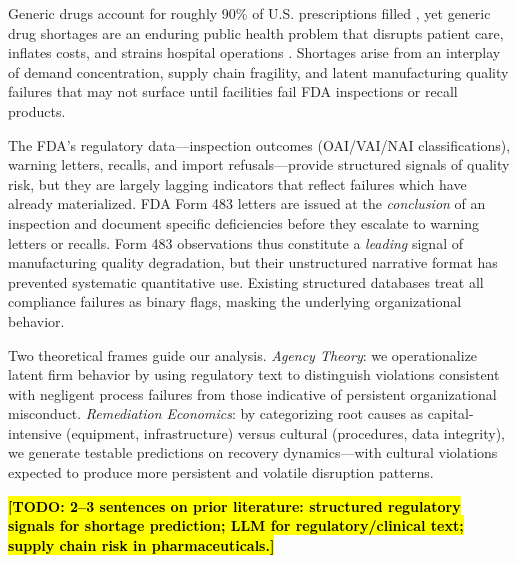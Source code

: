 \documentclass[12pt]{article}
\newcommand{\todo}[1]{\hl{\textbf{[TODO: #1]}}}
\begin{document}
Generic drugs account for roughly 90\% of U.S. prescriptions filled
\citep{fda2023generic}, yet generic drug shortages are an enduring public
health problem that disrupts patient care, inflates costs, and strains
hospital operations \citep{fox2014shortage}.
Shortages arise from an interplay of demand concentration, supply chain
fragility, and latent manufacturing quality failures that may not surface
until facilities fail FDA inspections or recall products.

The FDA's regulatory data—inspection outcomes (OAI/VAI/NAI classifications),
warning letters, recalls, and import refusals—provide structured signals of
quality risk, but they are largely lagging indicators that reflect failures
which have already materialized.
FDA Form 483 letters are issued at the \emph{conclusion} of an inspection and
document specific deficiencies before they escalate to warning letters or recalls.
Form 483 observations thus constitute a \emph{leading} signal of manufacturing
quality degradation, but their unstructured narrative format has prevented
systematic quantitative use.
Existing structured databases treat all compliance failures as binary flags,
masking the underlying organizational behavior.

Two theoretical frames guide our analysis.
\emph{Agency Theory}: we operationalize latent firm behavior by using regulatory
text to distinguish violations consistent with negligent process failures from
those indicative of persistent organizational misconduct.
\emph{Remediation Economics}: by categorizing root causes as capital-intensive
(equipment, infrastructure) versus cultural (procedures, data integrity), we
generate testable predictions on recovery dynamics---with cultural violations
expected to produce more persistent and volatile disruption patterns.

\todo{2--3 sentences on prior literature: structured regulatory signals for
shortage prediction; LLM for regulatory/clinical text; supply chain risk
in pharmaceuticals.}
\end{document}

